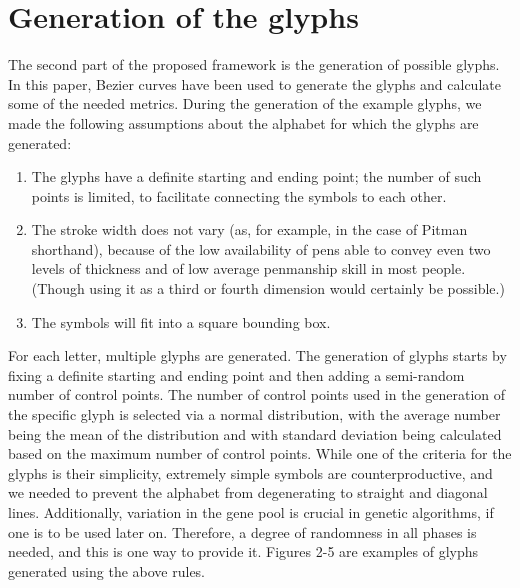 \documentclass{vgtc}                          %
\begin{document}
\section{Generation of the glyphs}
The second part of the proposed framework is the generation of possible glyphs. In this paper, Bezier curves have been used to generate the glyphs and calculate some of the needed metrics.
During the generation of the example glyphs, we made the following assumptions about the alphabet for which the glyphs are generated:
\begin{enumerate}
        \item The glyphs have a definite starting and ending point; the number of such points is limited, to facilitate connecting the symbols to each other.
        \item The stroke width does not vary (as, for example, in the case of Pitman shorthand), because of the low availability of pens able to convey even two levels of thickness and of low average penmanship skill in most people. (Though using it as a third or fourth dimension would certainly be possible.)
        \item The symbols will fit into a square bounding box.
\end{enumerate}
For each letter, multiple glyphs are generated. The generation of glyphs starts by fixing a definite starting and ending point and then adding a semi-random number of control points. The number of control points used in the generation of the specific glyph is selected via a normal distribution, with the average number being the mean of the distribution and with standard deviation being calculated based on the maximum number of control points. While one of the criteria for the glyphs is their
simplicity, extremely simple symbols are counterproductive, and we needed to prevent the alphabet from degenerating to straight and diagonal lines. Additionally, variation in the gene pool is crucial in genetic algorithms, if one is to be used later on. Therefore, a degree of randomness in all phases is needed, and this is one way to provide it. Figures 2-5 are examples of glyphs generated using the above rules.
\end{document}
